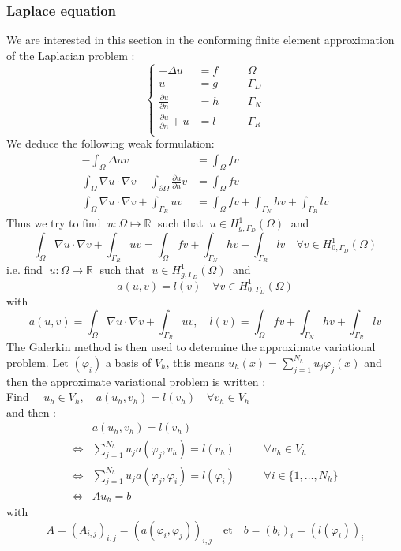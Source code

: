 \subsubsection{Laplace equation}

We are interested in this section in the conforming finite element approximation of the Laplacian problem :
\begin{equation}
	\left\{\begin{aligned}
		-\Delta u &= f \quad&&\Omega \\
		u&=g \quad&&\Gamma_D \\
		\frac{\partial u}{\partial n} &=h \quad &&\Gamma_N \\
		\frac{\partial u}{\partial n}+u &=l \quad &&\Gamma_R \\
	\end{aligned}\right.
\end{equation}
We deduce the following weak formulation:
\begin{align*}
	-\int_\Omega \Delta u v &= \int_\Omega fv \\
	\int_\Omega \nabla u \cdot \nabla v - \int_{\partial\Omega}\frac{\partial u}{\partial n}v &= \int_\Omega fv \\
	\int_\Omega \nabla u \cdot \nabla v + \int_{\Gamma_R}uv &= \int_\Omega fv + \int_{\Gamma_N}hv+\int_{\Gamma_R}lv
\end{align*}
Thus we try to find $\; u:\Omega \mapsto \mathbb{R} \;$ such that $\; u\in H_{g,\Gamma_D}^1(\Omega) \;$ and
\begin{equation*}
	\int_\Omega \nabla u \cdot \nabla v + \int_{\Gamma_R}uv = \int_\Omega fv + \int_{\Gamma_N}hv+\int_{\Gamma_R}lv \quad \forall v\in H_{0,\Gamma_D}^1(\Omega)
\end{equation*}
i.e. find $\; u:\Omega \mapsto \mathbb{R} \;$ such that $\; u\in H_{g,\Gamma_D}^1(\Omega) \;$ and
\begin{equation*}
	a(u,v)=l(v)  \quad \forall v\in H_{0,\Gamma_D}^1(\Omega)
\end{equation*}
with
$$a(u,v)=\int_\Omega \nabla u \cdot \nabla v + \int_{\Gamma_R}uv, \quad l(v)=\int_\Omega fv + \int_{\Gamma_N}hv+\int_{\Gamma_R}lv$$
The Galerkin method is then used to determine the approximate variational problem. Let $(\varphi_i)$ a basis of $V_h$, this means $u_h(x)=\sum_{j=1}^{N_h}u_j\varphi_j(x)$ and then the approximate variational problem is written : \\
Find $\quad u_h\in V_h, \quad a(u_h,v_h)=l(v_h) \quad \forall v_h\in V_h$ \\
and then :
$$\begin{aligned}
	&a(u_h,v_h)=l(v_h) \\
	\iff &\sum_{j=1}^{N_h}u_ja(\varphi_j,v_h)=l(v_h) \quad &&\forall v_h\in V_h \\
	\iff &\sum_{j=1}^{N_h}u_ja(\varphi_j,\varphi_i)=l(\varphi_i) \quad &&\forall i\in\{1,\dots,N_h\} \\
	\iff &Au_h=b
\end{aligned}$$
with
$$A=(A_{i,j})_{i,j}=(a(\varphi_i,\varphi_j))_{i,j} \quad  \text{et} \quad b=(b_i)_i=(l(\varphi_i))_i$$

